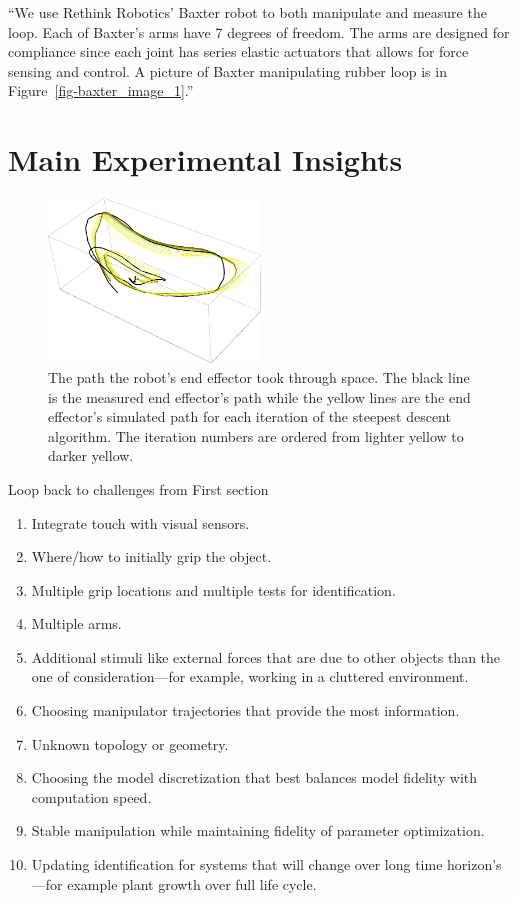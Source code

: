 \documentclass[runningheads,a4paper]{llncs}
\begin{document}
``We use Rethink Robotics' Baxter \cite{guizzo2011rethink} robot to both manipulate and measure the loop.  Each of Baxter's arms have 7 degrees of freedom.  The arms are designed for compliance since each joint has series elastic actuators that allows for force sensing and control.  A picture of Baxter manipulating rubber loop is in Figure~\ref{fig-baxter_image_1}.''

\newpage
\section{Main Experimental Insights}
\begin{figure}
\centering
\includegraphics[width = 160pt]{paths12.pdf}
\caption{The path the robot's end effector took through space.  The black line is the measured end effector's path while the yellow lines are the end effector's simulated path for each iteration of the steepest descent algorithm.  The iteration numbers are ordered from lighter yellow to darker yellow.  }
\label{fig-paths}
\end{figure}

Loop back to challenges from First section
\begin{enumerate}
  \item Integrate touch with visual sensors.
  \item Where/how to initially grip the object.
  \item Multiple grip locations and multiple tests for identification.
  \item Multiple arms.
  \item Additional stimuli like external forces that are due to other objects than the one of consideration---for example, working in a cluttered environment.
  \item Choosing manipulator trajectories that provide the most information.
  \item Unknown topology or geometry.
  \item Choosing the model discretization that best balances model fidelity with computation speed.
  \item Stable manipulation while maintaining fidelity of parameter optimization.
  \item Updating identification for systems that will change over long time horizon's---for example plant growth over full life cycle.
\end{enumerate}

\newpage


\end{document}
